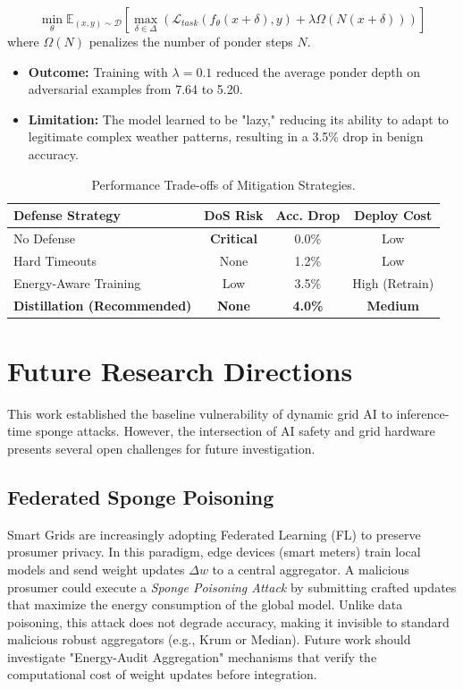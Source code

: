 \documentclass[conference]{IEEEtran}
\begin{document}
\begin{equation}
    \min_\theta \mathbb{E}_{(x,y) \sim \mathcal{D}} \left[ \max_{\delta \in \Delta} \left( \mathcal{L}_{task}(f_\theta(x+\delta), y) + \lambda \Omega(N(x+\delta)) \right) \right]
\end{equation}
where $\Omega(N)$ penalizes the number of ponder steps $N$.
\begin{itemize}
    \item \textbf{Outcome:} Training with $\lambda=0.1$ reduced the average ponder depth on adversarial examples from 7.64 to 5.20.
    \item \textbf{Limitation:} The model learned to be "lazy," reducing its ability to adapt to legitimate complex weather patterns, resulting in a 3.5\% drop in benign accuracy.
\end{itemize}

\begin{table}[h]
    \centering
    \caption{Performance Trade-offs of Mitigation Strategies.}
    \label{tab:defense_comparison}
    \renewcommand{\arraystretch}{1.2}
    \begin{tabular}{l c c c}
        \toprule
        \textbf{Defense Strategy} & \textbf{DoS Risk} & \textbf{Acc. Drop} & \textbf{Deploy Cost} \\
        \midrule
        No Defense & \textbf{Critical} & 0.0\% & Low \\
        Hard Timeouts & None & 1.2\% & Low \\
        Energy-Aware Training & Low & 3.5\% & High (Retrain) \\
        \textbf{Distillation (Recommended)} & \textbf{None} & \textbf{4.0\%} & \textbf{Medium} \\
        \bottomrule
    \end{tabular}
\end{table}

\section{Future Research Directions}
\label{sec:future}

This work established the baseline vulnerability of dynamic grid AI to inference-time sponge attacks. However, the intersection of AI safety and grid hardware presents several open challenges for future investigation.

\subsection{Federated Sponge Poisoning}
Smart Grids are increasingly adopting Federated Learning (FL) to preserve prosumer privacy. In this paradigm, edge devices (smart meters) train local models and send weight updates $\Delta w$ to a central aggregator.
A malicious prosumer could execute a \textit{Sponge Poisoning Attack} by submitting crafted updates that maximize the energy consumption of the global model. Unlike data poisoning, this attack does not degrade accuracy, making it invisible to standard malicious robust aggregators (e.g., Krum or Median). Future work should investigate "Energy-Audit Aggregation" mechanisms that verify the computational cost of weight updates before integration.
\end{document}
